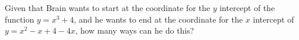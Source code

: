 Given that Brain wants to start at the coordinate for the $y$ intercept of the function $y = x^3+4$, and he wants to end at the coordinate for the $x$ intercept of $y = x^2-x+4-4x$, how many ways can he do this?
